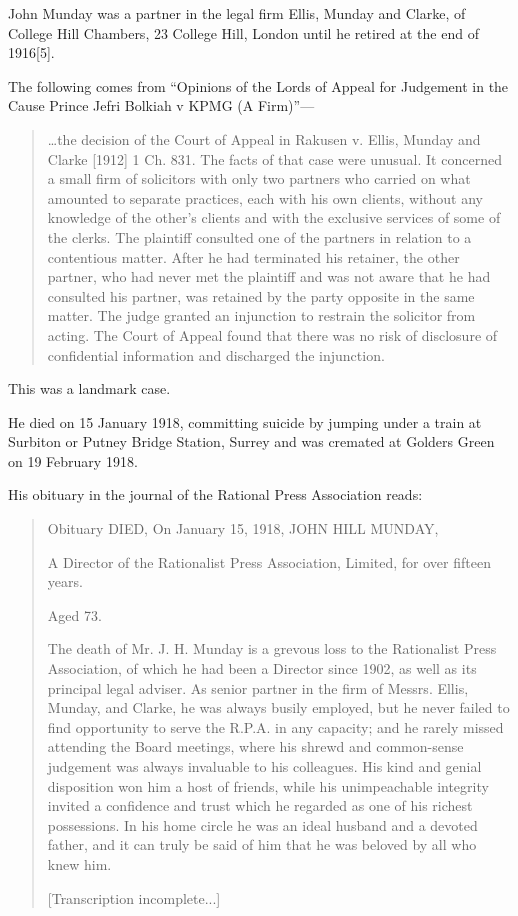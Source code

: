 John Munday was a partner in the legal firm Ellis, Munday and Clarke, of College Hill Chambers, 23 College Hill, London\cite{HeaddingtonMannor} until he retired at the end of 1916[5].

The following comes from ``Opinions of the Lords of Appeal for Judgement in the Cause Prince Jefri Bolkiah v KPMG (A Firm)''\cite{JohnHillMundayJudgement}---

\begin{quotation}
\dots the decision of the Court of Appeal in Rakusen v. Ellis, Munday and Clarke [1912] 1 Ch. 831. The facts of that case were unusual. It concerned a small firm of solicitors with only two partners who carried on what amounted to separate practices, each with his own clients, without any knowledge of the other's clients and with the exclusive services of some of the clerks. The plaintiff consulted one of the partners in relation to a contentious matter. After he had terminated his retainer, the other partner, who had never met the plaintiff and was not aware that he had consulted his partner, was retained by the party opposite in the same matter. The judge granted an injunction to restrain the solicitor from acting. The Court of Appeal found that there was no risk of disclosure of confidential information and discharged the injunction. 
\end{quotation}
This was a landmark case.\cite{JohnHillMundayJudgement}

He died on 15 January 1918, committing suicide by jumping under a train at Surbiton or Putney Bridge Station, Surrey \cite{JohnHillMundaySuicide} and was cremated at Golders Green on 19 February 1918.


His obituary in the journal of the Rational Press Association reads:

\begin{quotation}
Obituary
DIED,
On January 15, 1918,
JOHN HILL MUNDAY,

A Director of the Rationalist Press Association, Limited, for over fifteen years.

Aged 73.

The death of Mr. J. H. Munday is a grevous loss to the Rationalist Press Association, of which he had been a Director since 1902, as well as its principal legal adviser. As senior partner in the firm of Messrs. Ellis, Munday, and Clarke, he was always busily employed, but he never failed to find opportunity to serve the R.P.A. in any capacity; and he rarely missed attending the Board meetings, where his shrewd and common-sense judgement was always invaluable to his colleagues. His kind and genial disposition won him a host of friends, while his unimpeachable integrity invited a confidence and trust which he regarded as one of his richest possessions. In his home circle he was an ideal husband and a devoted father, and it can truly be said of him that he was beloved by all who knew him.

[Transcription incomplete...]
\end{quotation}

